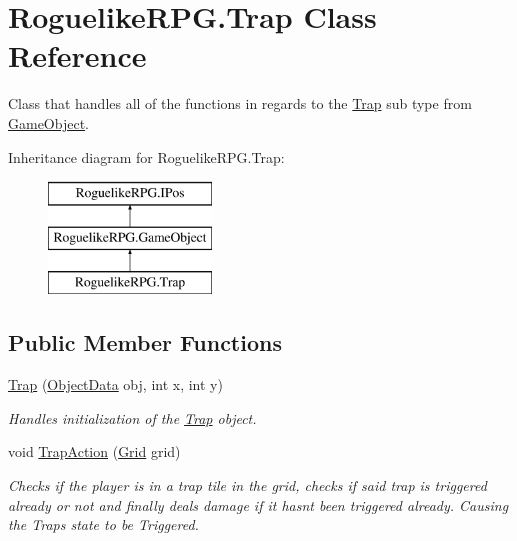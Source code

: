\hypertarget{class_roguelike_r_p_g_1_1_trap}{}\section{Roguelike\+R\+P\+G.\+Trap Class Reference}
\label{class_roguelike_r_p_g_1_1_trap}


Class that handles all of the functions in regards to the \mbox{\hyperlink{class_roguelike_r_p_g_1_1_trap}{Trap}} sub type from \mbox{\hyperlink{class_roguelike_r_p_g_1_1_game_object}{Game\+Object}}.  


Inheritance diagram for Roguelike\+R\+P\+G.\+Trap\+:\begin{figure}[H]
\begin{center}
\leavevmode
\includegraphics[height=3.000000cm]{class_roguelike_r_p_g_1_1_trap}
\end{center}
\end{figure}
\subsection*{Public Member Functions}
\begin{DoxyCompactItemize}
\item 
\mbox{\hyperlink{class_roguelike_r_p_g_1_1_trap_a75f7e3f09db85a57be63fea667c72ad9}{Trap}} (\mbox{\hyperlink{struct_roguelike_r_p_g_1_1_object_data}{Object\+Data}} obj, int x, int y)
\begin{DoxyCompactList}\small\item\em Handles initialization of the \mbox{\hyperlink{class_roguelike_r_p_g_1_1_trap}{Trap}} object. \end{DoxyCompactList}\item 
void \mbox{\hyperlink{class_roguelike_r_p_g_1_1_trap_a29a26903d96d45aee7a705fdbb191418}{Trap\+Action}} (\mbox{\hyperlink{class_roguelike_r_p_g_1_1_grid}{Grid}} grid)
\begin{DoxyCompactList}\small\item\em Checks if the player is in a trap tile in the grid, checks if said trap is triggered already or not and finally deals damage if it hasnt been triggered already. Causing the Traps state to be Triggered. \end{DoxyCompactList}\end{DoxyCompactItemize}

